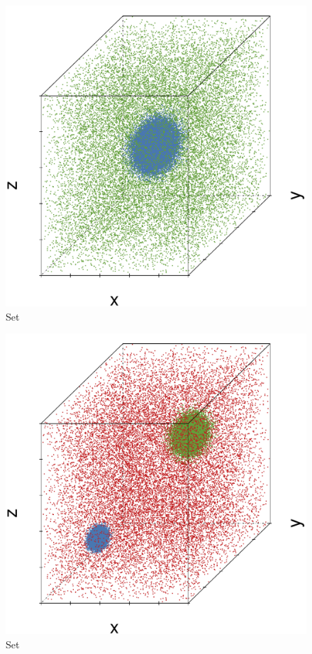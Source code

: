 \begin{subfigure}{0.18\textwidth}
	\centering
	\includegraphics[width=\textwidth]{3/img/datasetplot_ferdosi_1_60000.pdf}
	\caption{Set \ferdosiOne}
	\label{fig:3:simulated:datasets:ferdosi1}
\end{subfigure}
\begin{subfigure}{0.18\textwidth}
	\centering
	\includegraphics[width=\textwidth]{3/img/datasetplot_ferdosi_2_60000.pdf}
	\caption{Set \ferdosiTwo}
	\label{fig:3:simulated:datasets:ferdosi2}
\end{subfigure}	
